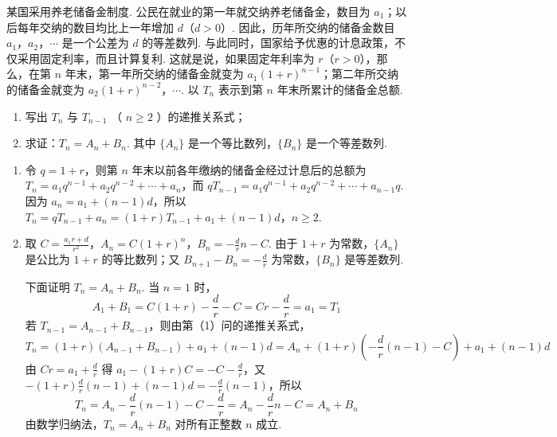 \begin{problem}
某国采用养老储备金制度. 公民在就业的第一年就交纳养老储备金，数目为 \(a_1\)；以后每年交纳的数目均比上一年增加 \(d\)（\(d > 0\)）. 因此，历年所交纳的储备金数目 \(a_1\)，\(a_2\)，\(\cdots\) 是一个公差为 \(d\) 的等差数列. 与此同时，国家给予优惠的计息政策，不仅采用固定利率，而且计算复利. 这就是说，如果固定年利率为 \(r\)（\(r > 0\)），那么，在第 \(n\) 年末，第一年所交纳的储备金就变为 \(a_1(1 + r)^{n-1}\)；第二年所交纳的储备金就变为 \(a_2(1 + r)^{n-2}\)，\(\cdots\). 以 \(T_n\) 表示到第 \(n\) 年末所累计的储备金总额.

\begin{enumerate}
\item 写出 \( T_{n} \) 与 \( T_{n-1} \) （ \( n \geqslant 2 \) ）的递推关系式；
\item 求证：\(T_{n} = A_{n} + B_{n}\). 其中 \(\{A_{n}\}\) 是一个等比数列，\(\{B_{n}\}\) 是一个等差数列.
\end{enumerate}
\end{problem}

\begin{solution}
\begin{enumerate}
\item 令 \(q=1+r\)，则第 \(n\) 年末以前各年缴纳的储备金经过计息后的总额为
\(T_{n}=a_{1}q^{n-1}+a_{2}q^{n-2}+\cdots+a_{n}\)，而
\(qT_{n-1}=a_{1}q^{n-1}+a_{2}q^{n-2}+\cdots+a_{n-1}q\). 因为 \(a_n=a_1+(n-1)d\)，所以
\(T_n=qT_{n-1}+a_n=(1+r)T_{n-1}+a_1+(n-1)d\)，\(n\geqslant2\).
\item 取
\(C=\frac{a_1r+d}{r^{2}}\)，\(A_n=C(1+r)^n\)，\(B_n=-\frac{d}{r}n-C\).
由于 \(1+r\) 为常数，\(\{A_n\}\) 是公比为 \(1+r\) 的等比数列；又 \(B_{n+1}-B_n=-\frac{d}{r}\) 为常数，\(\{B_n\}\) 是等差数列.

下面证明 \(T_n=A_n+B_n\). 当 \(n=1\) 时，
\[
A_1+B_1=C(1+r)-\frac{d}{r}-C=Cr-\frac{d}{r}=a_1=T_1
\]
若 \(T_{n-1}=A_{n-1}+B_{n-1}\)，则由第（1）问的递推关系式，
\[
T_n=(1+r)(A_{n-1}+B_{n-1})+a_1+(n-1)d
=A_n+(1+r)\left(-\frac{d}{r}(n-1)-C\right)+a_1+(n-1)d
\]
由 \(Cr=a_1+\frac{d}{r}\) 得
\(a_1-(1+r)C=-C-\frac{d}{r}\)，又
\(-(1+r)\frac{d}{r}(n-1)+(n-1)d=-\frac{d}{r}(n-1)\)，所以
\[
T_n=A_n-\frac{d}{r}(n-1)-C-\frac{d}{r}=A_n-\frac{d}{r}n-C=A_n+B_n
\]
由数学归纳法，\(T_n=A_n+B_n\) 对所有正整数 \(n\) 成立.
\end{enumerate}
\end{solution}
